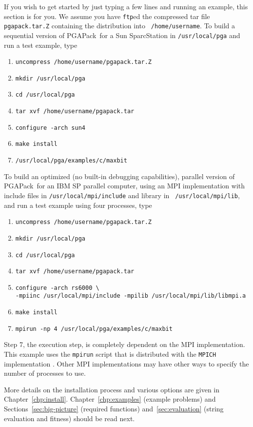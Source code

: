 \documentclass{report}
\newcommand{\pga}{PGAPack}
\begin{document}
If you wish to get started by just typing a few lines and running an example,
this section is for you.  We assume you have {\tt ftp}ed the compressed tar
file {\tt pgapack.tar.Z} containing the distribution into {\tt
/home/username}.  To build a sequential version of \pga\ for a Sun
SparcStation in {\tt /usr/local/pga} and run a test example, type
\begin{enumerate}
\item {\tt uncompress /home/username/pgapack.tar.Z}
\item {\tt mkdir /usr/local/pga}
\item {\tt cd /usr/local/pga}
\item {\tt tar xvf /home/username/pgapack.tar}
\item {\tt configure -arch sun4}
\item {\tt make install}
\item {\tt /usr/local/pga/examples/c/maxbit}
\end{enumerate}

To build an optimized (no built-in debugging capabilities), parallel
version of \pga\ for an IBM SP parallel computer, using an MPI implementation
with include files in {\tt /usr/local/mpi/include} and library in {\tt
/usr/local/mpi/lib}, and run a test example using four processes, type
\begin{enumerate}
\item {\tt uncompress /home/username/pgapack.tar.Z}
\item {\tt mkdir /usr/local/pga}
\item {\tt cd /usr/local/pga}
\item {\tt tar xvf /home/username/pgapack.tar}
\item {\tt configure -arch rs6000 \verb+\+ } \\
\hspace{.5in}
{\tt -mpiinc /usr/local/mpi/include -mpilib /usr/local/mpi/lib/libmpi.a}
\item {\tt make install}
\item {\tt mpirun -np 4 /usr/local/pga/examples/c/maxbit}
\end{enumerate}

Step 7, the execution step, is completely dependent on the MPI
implementation.  This  example uses the {\tt mpirun} script that is
distributed with the {\tt MPICH} implementation \cite{mpich-web-page}.
Other MPI implementations may have other ways to specify the number of
processes to use.  

More details on the installation process and various options are given in
Chapter~\ref{chp:install}.  Chapter~\ref{chp:examples} (example problems) and
Sections~\ref{sec:big-picture} (required functions) and~\ref{sec:evaluation}
(string evaluation and fitness) should be read next.
\end{document}
